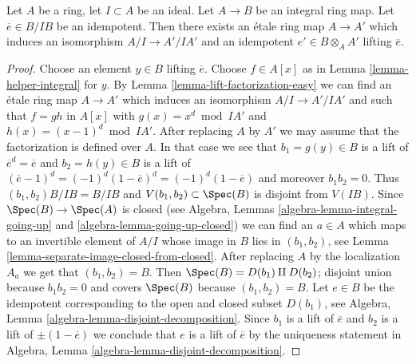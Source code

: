 \begin{lemma}
\label{lemma-lift-idempotent-upstairs}
Let $A$ be a ring, let $I \subset A$ be an ideal.
Let $A \to B$ be an integral ring map.
Let $\overline{e} \in B/IB$ be an idempotent.
Then there exists an \'etale ring map $A \to A'$
which induces an isomorphism $A/I \to A'/IA'$ and an idempotent
$e' \in B \otimes_A A'$ lifting $\overline{e}$.
\end{lemma}

\begin{proof}
Choose an element $y \in B$ lifting $\overline{e}$.
Choose $f \in A[x]$ as in Lemma \ref{lemma-helper-integral} for $y$.
By Lemma \ref{lemma-lift-factorization-easy}
we can find an \'etale ring map $A \to A'$ which induces
an isomorphism $A/I \to A'/IA'$ and such that $f = gh$
in $A[x]$ with $g(x) = x^d \bmod IA'$ and $h(x) = (x - 1)^d \bmod IA'$.
After replacing $A$ by $A'$ we may assume that the factorization
is defined over $A$. In that case we see that
$b_1 = g(y) \in B$ is a lift of $\overline{e}^d = \overline{e}$ and
$b_2 = h(y) \in B$ is a lift of
$(\overline{e} - 1)^d = (-1)^d (1 - \overline{e})^d = (-1)^d(1 - \overline{e})$
and moreover $b_1b_2 = 0$. Thus $(b_1, b_2)B/IB = B/IB$ and
$V(b_1, b_2) \subset \Spec(B)$ is disjoint from $V(IB)$. Since
$\Spec(B) \to \Spec(A)$ is closed (see
Algebra, Lemmas \ref{algebra-lemma-integral-going-up} and
\ref{algebra-lemma-going-up-closed})
we can find an $a \in A$ which maps to an invertible element
of $A/I$ whose image in $B$ lies in $(b_1, b_2)$, see
Lemma \ref{lemma-separate-image-closed-from-closed}.
After replacing $A$ by the localization $A_a$ we get that
$(b_1, b_2) = B$. Then $\Spec(B) = D(b_1) \amalg D(b_2)$;
disjoint union because $b_1b_2 = 0$ and covers
$\Spec(B)$ because $(b_1, b_2) = B$. Let $e \in B$ be the idempotent
corresponding to the open and closed subset $D(b_1)$, see
Algebra, Lemma \ref{algebra-lemma-disjoint-decomposition}.
Since $b_1$ is a lift of $\overline{e}$ and $b_2$ is a
lift of $\pm (1 - \overline{e})$ we conclude that $e$ is
a lift of $\overline{e}$ by the uniqueness statement in
Algebra, Lemma \ref{algebra-lemma-disjoint-decomposition}.
\end{proof}
